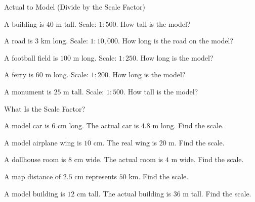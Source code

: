 \begin{practiceBox}{Actual to Model (Divide by the Scale Factor)}

\prob A building is $40$ m tall. Scale: $1 : 500$. How tall is the model? \answerBlank[3cm]

\prob A road is $3$ km long. Scale: $1 : 10{,}000$. How long is the road on the model? \answerBlank[3cm]

\prob A football field is $100$ m long. Scale: $1 : 250$. How long is the model? \answerBlank[3cm]

\prob A ferry is $60$ m long. Scale: $1 : 200$. How long is the model? \answerBlank[3cm]

\prob A monument is $25$ m tall. Scale: $1 : 500$. How tall is the model? \answerBlank[3cm]
\end{practiceBox}

\begin{practiceBox}[funTeal]{What Is the Scale Factor?}

\prob A model car is $6$ cm long. The actual car is $4.8$ m long. Find the scale. \answerBlank[3cm]

\prob A model airplane wing is $10$ cm. The real wing is $20$ m. Find the scale. \answerBlank[3cm]

\prob A dollhouse room is $8$ cm wide. The actual room is $4$ m wide. Find the scale. \answerBlank[3cm]

\prob A map distance of $2.5$ cm represents $50$ km. Find the scale. \answerBlank[3cm]

\prob A model building is $12$ cm tall. The actual building is $36$ m tall. Find the scale. \answerBlank[3cm]
\end{practiceBox}

